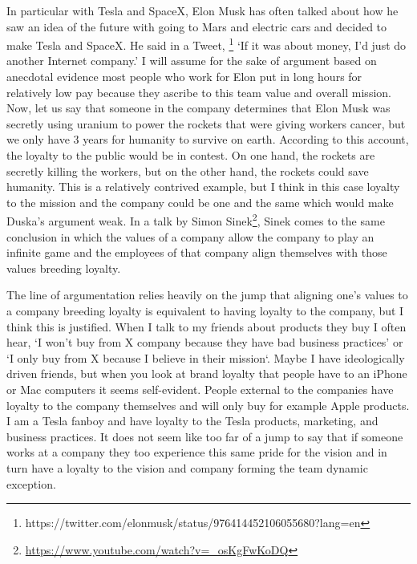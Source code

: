 \documentclass[12pt]{article}
\begin{document}
In particular with Tesla and SpaceX, Elon Musk has often talked about how he saw
an idea of the future with going to Mars and electric cars and decided to make
Tesla and SpaceX. He said in a Tweet,
\footnote{https://twitter.com/elonmusk/status/976414452106055680?lang=en} `If it
was about money, I’d just do another Internet company.' I will assume for the
sake of argument based on anecdotal evidence most people who work for Elon put
in long hours for relatively low pay because they ascribe to this team value and
overall mission. Now, let us say that someone in the company determines that
Elon Musk was secretly using uranium to power the rockets that were giving
workers cancer, but we only have 3 years for humanity to survive on earth.
According to this account, the loyalty to the public would be in contest. On one
hand, the rockets are secretly killing the workers, but on the other hand, the
rockets could save humanity. This is a relatively contrived example, but I think
in this case loyalty to the mission and the company could be one and the same
which would make Duska's argument weak. In a talk by Simon
Sinek\footnote{\url{https://www.youtube.com/watch?v=_osKgFwKoDQ}}, Sinek comes
to the same conclusion in which the values of a company allow the company to
play an infinite game and the employees of that company align themselves with
those values breeding loyalty.

The line of argumentation relies heavily on the jump that aligning one's values
to a company breeding loyalty is equivalent to having loyalty to the company,
but I think this is justified. When I talk to my friends about products they buy
I often hear, `I won't buy from X company because they have bad business
practices' or `I only buy from X because I believe in their mission`. Maybe I
have ideologically driven friends, but when you look at brand loyalty that
people have to an iPhone or Mac computers it seems self-evident. People external
to the companies have loyalty to the company themselves and will only buy for
example Apple products. I am a Tesla fanboy and have loyalty to the Tesla
products, marketing, and business practices. It does not seem like too far of a
jump to say that if someone works at a company they too experience this same
pride for the vision and in turn have a loyalty to the vision and company
forming the team dynamic exception.
\end{document}
